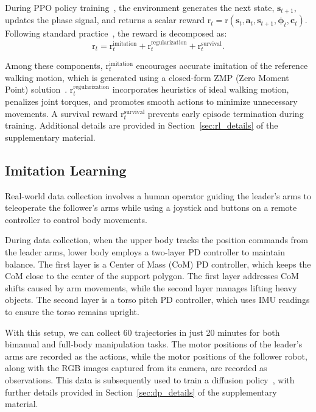 During PPO policy training~\citep{schulman2017proximal}, the environment generates the next state, $\bm{s}_{t+1}$, updates the phase signal, and returns a scalar reward $\mathrm{r}_t = \mathrm{r}(\bm{s}_t, \bm{a}_t, \bm{s}_{t+1}, \bm{\phi}_t, \bm{c}_t)$. Following standard practice~\citep{grandia2024design}, the reward is decomposed as:
\begin{equation}
    \mathrm{r}_t = \mathrm{r}_t^{\text{imitation}} + \mathrm{r}_t^{\text{regularization}} + \mathrm{r}_t^{\text{survival}}.
\end{equation}

Among these components, $\mathrm{r}_t^{\text{imitation}}$ encourages accurate imitation of the reference walking motion, which is generated using a closed-form ZMP (Zero Moment Point) solution~\citep{tedrake2015closedform}.  $\mathrm{r}_t^{\text{regularization}}$ incorporates heuristics of ideal walking motion, penalizes joint torques, and promotes smooth actions to minimize unnecessary movements. A survival reward $\mathrm{r}_t^{\text{survival}}$ prevents early episode termination during training. Additional details are provided in Section~\ref{sec:rl_details} of the supplementary material.




\subsection{Imitation Learning}

Real-world data collection involves a human operator guiding the leader’s arms to teleoperate the follower’s arms while using a joystick and buttons on a remote controller to control body movements.

During data collection, when the upper body tracks the position commands from the leader arms, \systems lower body employs a two-layer PD controller to maintain balance. The first layer is a Center of Mass (CoM) PD controller, which keeps the CoM close to the center of the support polygon. The first layer addresses CoM shifts caused by arm movements, while the second layer manages lifting heavy objects. The second layer is a torso pitch PD controller, which uses IMU readings to ensure the torso remains upright. 
 




With this setup, we can collect 60 trajectories in just 20 minutes for both bimanual and full-body manipulation tasks. The motor positions of the leader's arms are recorded as the actions, while the motor positions of the follower robot, along with the RGB images captured from its camera, are recorded as observations. This data is subsequently used to train a diffusion policy~\citep{chi2023diffusion}, with further details provided in Section~\ref{sec:dp_details} of the supplementary material.
